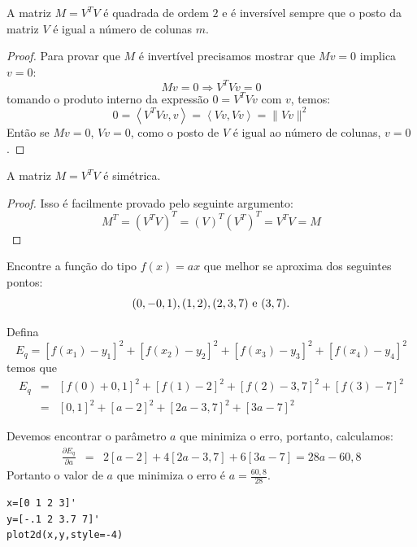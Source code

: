 \begin{teo}
A matriz $M=V^TV$ é quadrada de ordem $2$ e é inversível sempre que o posto da matriz $V$ é igual a número de colunas $m$.
\end{teo}
\begin{proof}
Para provar que $M$ é invertível precisamos mostrar que $Mv=0$ implica $v=0$:
$$Mv=0\Longrightarrow V^TVv=0$$
tomando o produto interno da expressão $0=V^TVv$ com $v$, temos:
$$0=\left<V^TVv,v\right>=\left<Vv,Vv\right>=\|Vv\|^2$$
Então se $Mv=0$, $Vv=0$, como o posto de $V$ é igual ao número de colunas, $v=0$.
\end{proof}
\begin{lem}
 A matriz $M=V^TV$ é simétrica.
\end{lem}
\begin{proof}
Isso é facilmente provado pelo seguinte argumento:
$$M^T=(V^TV)^T=(V)^T(V^T)^T=V^TV=M$$
\end{proof}




\begin{ex} Encontre a função do tipo $f(x)=ax$ que melhor se aproxima dos seguintes pontos:
  \begin{equation*}
    (0, -0,1), (1, 2), (2, 3,7) ~ \hbox{e} ~(3, 7).  
  \end{equation*}
\end{ex}
\begin{sol}
Defina $$E_q=[f(x_1)-y_1]^2+[f(x_2)-y_2]^2+[f(x_3)-y_3]^2+[f(x_4)-y_4]^2$$
temos que
\begin{eqnarray*}
E_q&=&[f(0)+0,1]^2+[f(1)-2]^2+[f(2)-3,7]^2+[f(3)-7]^2\\
&=&[0,1]^2+[a-2]^2+[2a-3,7]^2+[3a-7]^2
\end{eqnarray*}

Devemos encontrar o parâmetro $a$ que minimiza o erro, portanto, calculamos:
\begin{eqnarray*}
\frac{\partial E_q}{\partial a}&=&2[a-2]+4[2a-3,7]+6[3a-7]=28a-60,8
\end{eqnarray*}
Portanto o valor de $a$ que minimiza o erro é $a=\frac{60,8}{28}$.
\ifisscilab
\begin{verbatim}
x=[0 1 2 3]'
y=[-.1 2 3.7 7]'
plot2d(x,y,style=-4)
\end{verbatim}
\fi
\end{sol}

